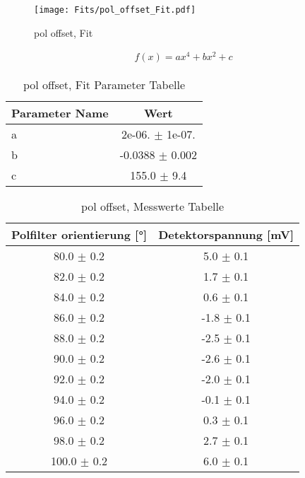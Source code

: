\begin{figure}[ht] 
 	\centering 
 	\texttt{[image: Fits/pol\_offset\_Fit.pdf]} 
	\caption{pol offset, Fit} 
 	\label{fig:pol offset, Fit} 
\end{figure}
 
\begin{align} 
 	 f(x) = a x^{4} + b x^{2} + c
\end{align} 

 
\begin{table}[ht] 
	\centering 
	\caption{pol offset, Fit Parameter Tabelle} 
	\label{tab: pol offset, Fit Parameter Tabelle}
	\begin{tabular}{|l|c|}
		\hline
		Parameter Name	&	Wert \\ \hline
		a	&	 2e-06. $\pm$  1e-07.\\ \hline
		b	&	-0.0388 $\pm$  0.002\\ \hline
		c	&	 155.0 $\pm$  9.4\\ \hline
	\end{tabular} 
\end{table}
 
\begin{table}[ht] 
	\centering 
	\caption{pol offset, Messwerte Tabelle} 
	\label{tab: pol offset, Messwerte Tabelle}
	\begin{tabular}{|c|c|}
		\hline
		Polfilter orientierung [°] 	&	 Detektorspannung [mV]\\ \hline
		80.0 $\pm$ 0.2 	&	 5.0 $\pm$ 0.1 \\ \hline
		82.0 $\pm$ 0.2 	&	 1.7 $\pm$ 0.1 \\ \hline
		84.0 $\pm$ 0.2 	&	 0.6 $\pm$ 0.1 \\ \hline
		86.0 $\pm$ 0.2 	&	 -1.8 $\pm$ 0.1 \\ \hline
		88.0 $\pm$ 0.2 	&	 -2.5 $\pm$ 0.1 \\ \hline
		90.0 $\pm$ 0.2 	&	 -2.6 $\pm$ 0.1 \\ \hline
		92.0 $\pm$ 0.2 	&	 -2.0 $\pm$ 0.1 \\ \hline
		94.0 $\pm$ 0.2 	&	 -0.1 $\pm$ 0.1 \\ \hline
		96.0 $\pm$ 0.2 	&	 0.3 $\pm$ 0.1 \\ \hline
		98.0 $\pm$ 0.2 	&	 2.7 $\pm$ 0.1 \\ \hline
		100.0 $\pm$ 0.2 	&	 6.0 $\pm$ 0.1 \\ \hline
	\end{tabular} 
\end{table}
 
